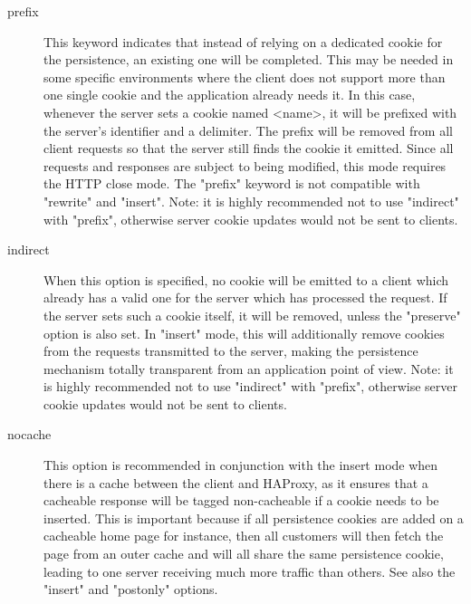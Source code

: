 \begin{description}
  \item[prefix]    This keyword indicates that instead of relying on a dedicated
              cookie for the persistence, an existing one will be completed.
              This may be needed in some specific environments where the client
              does not support more than one single cookie and the application
              already needs it. In this case, whenever the server sets a cookie
              named <name>, it will be prefixed with the server's identifier
              and a delimiter. The prefix will be removed from all client
              requests so that the server still finds the cookie it emitted.
              Since all requests and responses are subject to being modified,
              this mode requires the HTTP close mode. The "prefix" keyword is
              not compatible with "rewrite" and "insert". Note: it is highly
              recommended not to use "indirect" with "prefix", otherwise server
              cookie updates would not be sent to clients.

  \item[indirect]  When this option is specified, no cookie will be emitted to a
              client which already has a valid one for the server which has
              processed the request. If the server sets such a cookie itself,
              it will be removed, unless the "preserve" option is also set. In
              "insert" mode, this will additionally remove cookies from the
              requests transmitted to the server, making the persistence
              mechanism totally transparent from an application point of view.
              Note: it is highly recommended not to use "indirect" with
              "prefix", otherwise server cookie updates would not be sent to
              clients.

  \item[nocache]   This option is recommended in conjunction with the insert mode
              when there is a cache between the client and HAProxy, as it
              ensures that a cacheable response will be tagged non-cacheable if
              a cookie needs to be inserted. This is important because if all
              persistence cookies are added on a cacheable home page for
              instance, then all customers will then fetch the page from an
              outer cache and will all share the same persistence cookie,
              leading to one server receiving much more traffic than others.
              See also the "insert" and "postonly" options.


\end{description}
